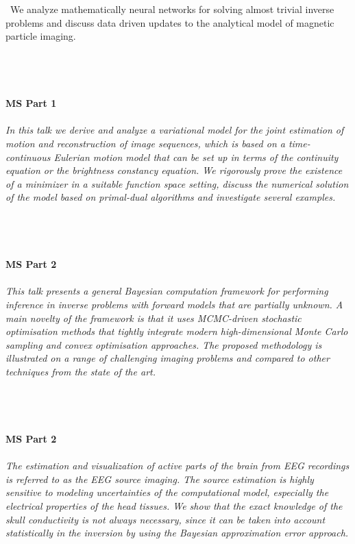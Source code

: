 \begin{multicols}{2}
{\
We analyze mathematically neural networks for solving almost trivial inverse problems and discuss data driven updates to the analytical model of magnetic particle imaging.}\\
\\ 
    \\
    \\\\
    \noindent\textbf{MS Part 1}\\
\\  
    \textit{In this talk we derive and analyze a variational model for the joint estimation of motion and reconstruction of image sequences, which is based on a time-continuous Eulerian motion model that can be set up in terms of the continuity equation or the brightness constancy equation. We rigorously prove the existence of a minimizer in a suitable function space setting, discuss the numerical solution of the model based on primal-dual algorithms and investigate several examples.}\\
\\ 
    \\
    \\\\
    \noindent\textbf{MS Part 2}\\
\\  
    \textit{This talk presents a general Bayesian computation framework for performing inference in inverse problems with forward models that are partially unknown. A main novelty of the framework is that it uses MCMC-driven stochastic optimisation methods that tightly integrate modern high-dimensional Monte Carlo sampling and convex optimisation approaches. The proposed methodology is illustrated on a range of challenging imaging problems and compared to other techniques from the state of the art.}\\
\\ 
    \\
    \\\\
    \noindent\textbf{MS Part 2}\\
\\  
    \textit{The estimation and visualization of active parts of the brain from EEG recordings is referred to as the EEG source imaging. The source estimation is highly sensitive to modeling uncertainties of the computational model, especially the electrical properties of the head tissues.  We show that the exact knowledge of the skull conductivity is not always necessary, since it can be taken into account statistically in the inversion by using the Bayesian approximation error approach.}\\

\end{multicols}
